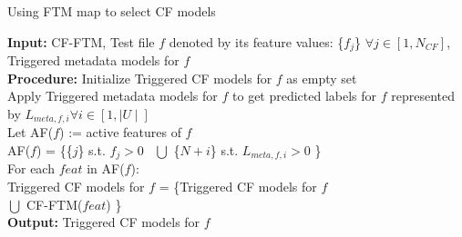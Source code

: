 { \begin{algorithm}[t!]
 {\fontsize{8pt}{1em}\selectfont
 \caption{Using FTM map to select CF models} 
 \label{alg:speedupCFTesting} 
 \textbf{Input:} 
CF-FTM, Test file $f$  denoted by its feature values: \{$f_j$\} $\forall j \in [1,N_{CF}]$, Triggered metadata models for $f$ \\ 
\textbf{Procedure: } 
Initialize Triggered CF models for $f$ as empty set \\ 
Apply Triggered metadata models for $f$ to get predicted labels for $f$ represented by $L_{meta, f, i} \forall i \in [1, \mid\!\!U\!\!\mid] $ \\
Let AF($f$) := active features of $f$ \\ 
AF($f$) = \big\{\{$j$\} s.t. $f_j  > 0$  \, $\bigcup$  \{$N+i$\} s.t. $L_{meta, f, i} > 0 $ \big\} \\ 
For each $feat$ in AF($f$): \\ 
\hspace*{2mm} Triggered CF models for $f$ = \big\{Triggered CF models for $f$ \\  \hspace*{45mm} $\bigcup$  CF-FTM($feat$) \big\} \\ 
\textbf{Output:} Triggered CF models for $f$ 
 }
 \end{algorithm}

}
